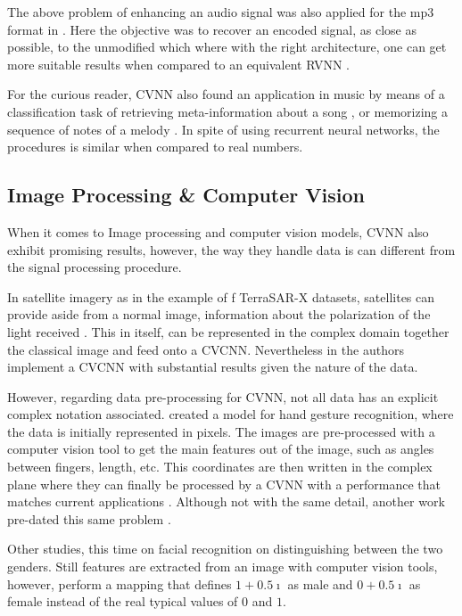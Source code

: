 The above problem of enhancing an audio signal was also applied for the mp3 format in \parencite{al2012mp3enhance}. Here the objective was to recover an encoded signal, as close as possible, to the unmodified which where with the right architecture, one can get more suitable results when compared to an equivalent \gls{RVNN} \parencite{al2012mp3enhance}.

For the curious reader, \gls{CVNN} also found an application in music by means of a classification task of retrieving meta-information about a song \parencite{kataoka1998music}, or memorizing a sequence of notes of a melody \parencite{kinouchi1996memorization}. In spite of \parencite{kataoka1998music} using recurrent neural networks, the procedures is similar when compared to real numbers.

\subsection{Image Processing \& Computer Vision}

When it comes to Image processing and computer vision models, \gls{CVNN} also exhibit promising results, however, the way they handle data is can different from the signal processing procedure.

In satellite imagery as in the example of f TerraSAR-X datasets, satellites can provide aside from a normal image, information about the polarization of the light received \parencite{gleich2018complex}. This in itself, can be represented in the complex domain together the classical image and feed onto a \gls{CVCNN}. Nevertheless in \parencite{gleich2018complex} the authors implement a \gls{CVCNN} with substantial results given the nature of the data.

However, regarding data pre-processing for \gls{CVNN}, not all data has an explicit complex notation associated. \textcite{liu2014handgestures} created a model for hand gesture recognition, where the data is initially represented in pixels. The images are pre-processed with a computer vision tool to get the main features out of the image, such as angles between fingers, length, etc. This coordinates are then written in the complex plane where they can finally be processed by a \gls{CVNN} with a performance that matches current applications \parencite{liu2014handgestures}. Although not with the same detail, another work pre-dated this same problem \parencite{hafiz2011handgesturecvnn}.

Other studies, this time on facial recognition on distinguishing between the two genders. Still features are extracted from an image with computer vision tools, however, \textcite{amilia2015face} perform a mapping that defines $ 1 + 0.5\imath $ as male and $ 0 + 0.5\imath $ as female instead of the real typical values of $0$ and $1$.

